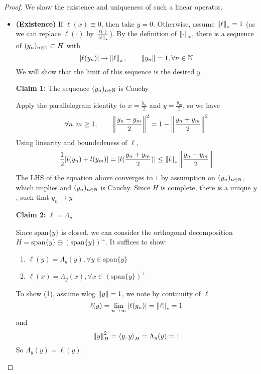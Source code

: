 \documentclass{article}
\begin{document}
\begin{proof}
    We show the existence and uniqueness of such a linear operator.  
    \begin{itemize}
        \item \textbf{(Existence)} If $\ell(x)\equiv 0$, then take $y=0$. Otherwise, assume $\left\|{\ell}\right\|_*=1$ (as we can replace $\ell(\cdot)$ by $\frac{\ell(\cdot)}{\left\|{\ell}\right\|_*}$).  
        By the definition of $\left\|{\cdot}\right\|_*$, there is a sequence of $(y_n)_{n\in \mathbb{N}} \subset H$ with  
        \begin{equation*}
            |\ell(y_n)| \to \left\|{\ell}\right\|_*, \qquad \left\|{y_n}\right\|=1, \forall n \in \mathbb{N}
        \end{equation*}
        We will show that the limit of this sequence is the desired $y$.  
        
        \textbf{Claim 1:} The sequence $(y_n)_{n \in \mathbb{N}}$ is Cauchy   
        
        Apply the parallelogram identity to $x = \frac{y_n}{2}$ and $y = \frac{y_m}{2}$, so we have  
        \begin{equation*}
            \forall n,m \geq 1, \qquad \left\|{\frac{y_n-y_m}{2}}\right\|^2=1-\left\|{\frac{y_n+y_m}{2}}\right\|^2
        \end{equation*}  
        Using linearity and boundedeness of $\ell$,   
        \begin{equation*}
            \frac{1}{2} |l(y_n)+l(y_m)| = |l(\frac{y_n+y_m}{2})| \leq \left\|{l}\right\|_* \left\|{\frac{y_n+y_m}{2}}\right\|
        \end{equation*}  
        The LHS of the equation above converges to $1$ by assumption on $(y_n)_{n \in \mathbb{N}}$, which implies and $(y_n)_{n \in \mathbb{N}}$ is Cauchy.  
        Since $H$ is complete, there is a unique $y$, such that $y_n \to y$  
        
        \textbf{Claim 2:} $\ell=\Lambda_y$  
        
        Since $\textrm{span}\{y\}$ is closed, we can consider the orthogonal decomposition $H = \textrm{span}\{y\} \oplus (\textrm{span}\{y\})^{\perp}$.  
        It suffices to show:  
        \begin{enumerate}[(1)]
            \item $\ell(y)=\Lambda_y(y), \forall y \in \textrm{span}\{y\}$
            \item $\ell(x)=\Lambda_y(x), \forall x \in (\textrm{span}\{y\})^{\perp}$
        \end{enumerate}  
        To show (1), assume wlog $\left\|{y}\right\|=1$, we note by continuity of $\ell$  
        \begin{equation*}
            \ell(y) = \lim_{n \to \infty} |\ell(y_n)| = \left\|{\ell}\right\|_*=1
        \end{equation*}  
        and 
        \begin{equation*}
            \left\|{y}\right\|^2_H = \left<{y},{y}\right>_H =\Lambda_y(y)=1
        \end{equation*}  
        So $\Lambda_y(y)=\ell(y)$.  
        

\end{itemize}
\end{proof}
\end{document}
